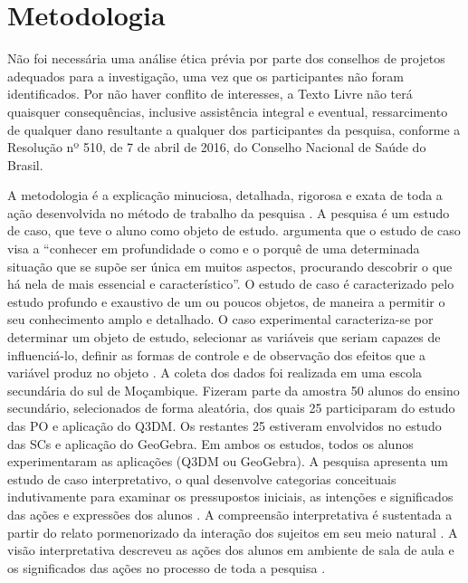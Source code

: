 \section{Metodologia}\label{sec-metodologia}

Não foi necessária uma análise ética prévia por parte dos conselhos de
projetos adequados para a investigação, uma vez que os participantes não
foram identificados. Por não haver conflito de interesses, a Texto Livre
não terá quaisquer consequências, inclusive assistência integral e
eventual, ressarcimento de qualquer dano resultante a qualquer dos
participantes da pesquisa, conforme a Resolução nº 510, de 7 de abril de
2016, do Conselho Nacional de Saúde do Brasil.

A metodologia é a explicação minuciosa, detalhada, rigorosa e exata de
toda a ação desenvolvida no método de trabalho da pesquisa \cite{lakatos2003}. A pesquisa é um estudo de caso, que teve o aluno como
objeto de estudo. \textcite[p. 32]{yin2005} argumenta que o estudo de caso visa a \enquote{conhecer em profundidade o como e o porquê de uma determinada
	situação que se supõe ser única em muitos aspectos, procurando descobrir
	o que há nela de mais essencial e característico}. O estudo de caso é
caracterizado pelo estudo profundo e exaustivo de um ou poucos objetos,
de maneira a permitir o seu conhecimento amplo e detalhado. O caso
experimental caracteriza-se por determinar um objeto de estudo,
selecionar as variáveis que seriam capazes de influenciá-lo, definir as
formas de controle e de observação dos efeitos que a variável produz no
objeto \cite{gil2002}. A coleta dos dados foi realizada em uma escola
secundária do sul de Moçambique. Fizeram parte da amostra 50 alunos do
ensino secundário, selecionados de forma aleatória, dos quais 25
participaram do estudo das PO e aplicação do Q3DM. Os restantes 25
estiveram envolvidos no estudo das SCs e aplicação do GeoGebra. Em ambos
os estudos, todos os alunos experimentaram as aplicações (Q3DM ou
GeoGebra). A pesquisa apresenta um estudo de caso interpretativo, o qual
desenvolve categorias conceituais indutivamente para examinar os
pressupostos iniciais, as intenções e significados das ações e
expressões dos alunos \cite{amado2017}. A compreensão interpretativa é
sustentada a partir do relato pormenorizado da interação dos sujeitos em
seu meio natural \cite{coulon1995}. A visão interpretativa descreveu as
ações dos alunos em ambiente de sala de aula e os significados das ações
no processo de toda a pesquisa \cite{coutinho2011}.

